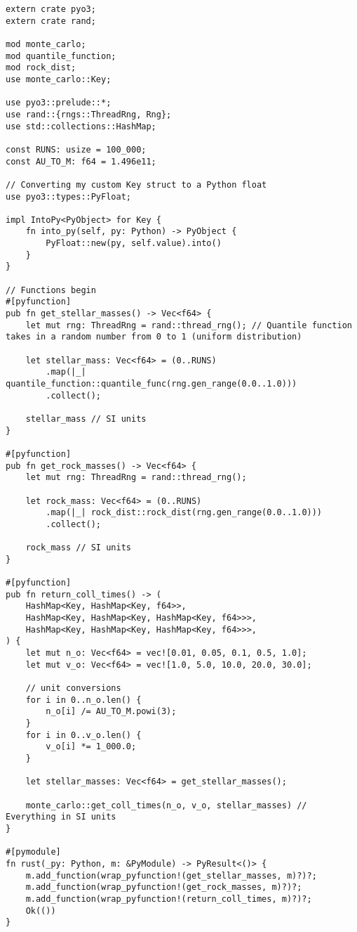 \begin{lstlisting}
extern crate pyo3;
extern crate rand;

mod monte_carlo;
mod quantile_function;
mod rock_dist;
use monte_carlo::Key;

use pyo3::prelude::*;
use rand::{rngs::ThreadRng, Rng};
use std::collections::HashMap;

const RUNS: usize = 100_000;
const AU_TO_M: f64 = 1.496e11;

// Converting my custom Key struct to a Python float
use pyo3::types::PyFloat;

impl IntoPy<PyObject> for Key {
    fn into_py(self, py: Python) -> PyObject {
        PyFloat::new(py, self.value).into()
    }
}

// Functions begin
#[pyfunction]
pub fn get_stellar_masses() -> Vec<f64> {
    let mut rng: ThreadRng = rand::thread_rng(); // Quantile function takes in a random number from 0 to 1 (uniform distribution)

    let stellar_mass: Vec<f64> = (0..RUNS)
        .map(|_| quantile_function::quantile_func(rng.gen_range(0.0..1.0)))
        .collect();

    stellar_mass // SI units
}

#[pyfunction]
pub fn get_rock_masses() -> Vec<f64> {
    let mut rng: ThreadRng = rand::thread_rng();

    let rock_mass: Vec<f64> = (0..RUNS)
        .map(|_| rock_dist::rock_dist(rng.gen_range(0.0..1.0)))
        .collect();

    rock_mass // SI units
}

#[pyfunction]
pub fn return_coll_times() -> (
    HashMap<Key, HashMap<Key, f64>>,
    HashMap<Key, HashMap<Key, HashMap<Key, f64>>>,
    HashMap<Key, HashMap<Key, HashMap<Key, f64>>>,
) {
    let mut n_o: Vec<f64> = vec![0.01, 0.05, 0.1, 0.5, 1.0];
    let mut v_o: Vec<f64> = vec![1.0, 5.0, 10.0, 20.0, 30.0];

    // unit conversions
    for i in 0..n_o.len() {
        n_o[i] /= AU_TO_M.powi(3);
    }
    for i in 0..v_o.len() {
        v_o[i] *= 1_000.0;
    }

    let stellar_masses: Vec<f64> = get_stellar_masses();

    monte_carlo::get_coll_times(n_o, v_o, stellar_masses) // Everything in SI units
}

#[pymodule]
fn rust(_py: Python, m: &PyModule) -> PyResult<()> {
    m.add_function(wrap_pyfunction!(get_stellar_masses, m)?)?;
    m.add_function(wrap_pyfunction!(get_rock_masses, m)?)?;
    m.add_function(wrap_pyfunction!(return_coll_times, m)?)?;
    Ok(())
}
\end{lstlisting}